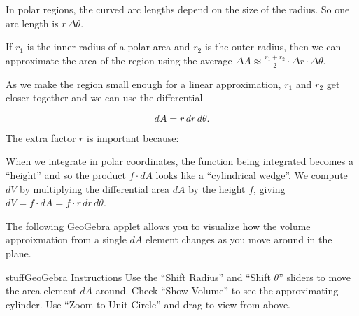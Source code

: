 \documentclass{ximera}
\begin{document}
\begin{problem}
\begin{center}
\end{center}

In polar regions, the curved arc lengths depend on the size of the radius. So one arc length is $ r\,\Delta\theta$. 

If $r_1$ is the inner radius of a polar area and $r_2$ is the outer radius, then we can approximate the area of the region using the average $\Delta A\approx \frac{r_1 + r_2}{2} \cdot \Delta r \cdot \Delta\theta$. 

As we make the region small enough for a linear approximation, $r_1$ and $r_2$ get closer together and we can use the differential

$$dA = r\,dr\,d\theta.$$


The extra factor $r$ is important because:

\begin{multipleChoice}
\end{multipleChoice}

When we integrate in polar coordinates, the function being integrated becomes a ``height'' and so the product $f\cdot dA$ looks like a ``cylindrical wedge''. We compute $dV$ by multiplying the differential area $dA$ by the height $f$, giving $dV=f\cdot dA = f\cdot r\,dr\,d\theta$.

The following GeoGebra applet allows you to visualize how the volume approixmation from a single $dA$ element changes as you move around in the plane.  

\begin{expandable}{stuff}{GeoGebra Instructions}
    Use the ``Shift Radius'' and ``Shift $\theta$'' sliders to move the area element $dA$ around. Check ``Show Volume'' to see the approximating cylinder. Use ``Zoom to Unit Circle'' and drag to view from above.
\end{expandable}

\begin{center}
\end{center}
\end{problem}
\end{document}
